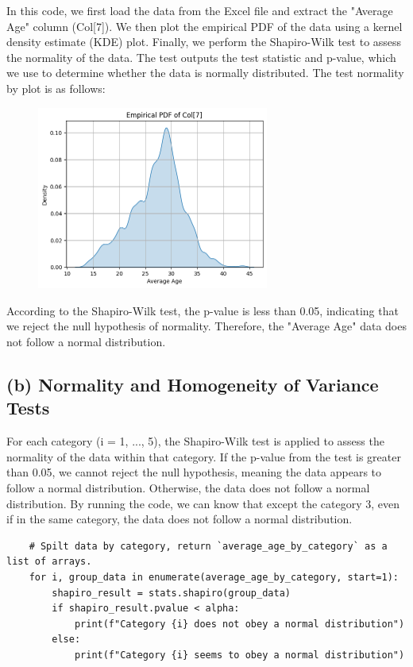 \documentclass[12pt]{article}
\begin{document}
In this code, we first load the data from the Excel file and extract the "Average Age" column (Col[7]). We then plot the empirical PDF of the data using a kernel density estimate (KDE) plot. Finally, we perform the Shapiro-Wilk test to assess the normality of the data. The test outputs the test statistic and p-value, which we use to determine whether the data is normally distributed. The test normality by plot is as follows:

\begin{figure}[h]
    \centering
    \includegraphics[width=0.68\textwidth]{image/output1.png}  
    \label{fig:Output for Normality Test}
\end{figure}

According to the Shapiro-Wilk test, the p-value is less than 0.05, indicating that we reject the null hypothesis of normality. Therefore, the "Average Age" data does not follow a normal distribution.

\subsection*{(b) Normality and Homogeneity of Variance Tests}

For each category (i = 1, ..., 5), the Shapiro-Wilk test is applied to assess the normality of the data within that category. If the p-value from the test is greater than 0.05, we cannot reject the null hypothesis, meaning the data appears to follow a normal distribution. Otherwise, the data does not follow a normal distribution.
By running the code, we can know that except the category 3, even if in the same category, the data does not follow a normal distribution.

\begin{verbatim}
    # Spilt data by category, return `average_age_by_category` as a list of arrays.
    for i, group_data in enumerate(average_age_by_category, start=1):
        shapiro_result = stats.shapiro(group_data)
        if shapiro_result.pvalue < alpha:
            print(f"Category {i} does not obey a normal distribution")
        else:
            print(f"Category {i} seems to obey a normal distribution")
\end{verbatim}
\end{document}
